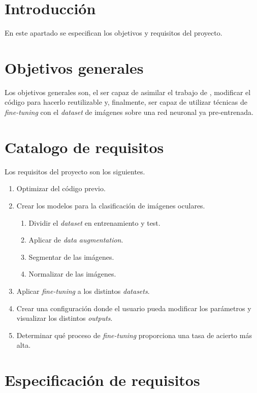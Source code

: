 
\section{Introducción}

En este apartado se especifican los objetivos y requisitos del proyecto.

\section{Objetivos generales}

Los objetivos generales son, el ser capaz de asimilar el trabajo de \cite{tfg_iris_2020}, modificar el código para hacerlo reutilizable y, finalmente, ser capaz de 
utilizar técnicas de \textit{fine-tuning} con el \textit{dataset} de imágenes sobre una red neuronal ya pre-entrenada.

\section{Catalogo de requisitos}

Los requisitos del proyecto son los siguientes.

\begin{enumerate}
    \item Optimizar del código previo.
    \item Crear los modelos para la clasificación de imágenes oculares.
        \begin{enumerate}
            \item Dividir el \textit{dataset} en entrenamiento y test.
            \item Aplicar de \textit{data augmentation}.
            \item Segmentar de las imágenes.
            \item Normalizar de las imágenes.
        \end{enumerate}
    \item Aplicar \textit{fine-tuning} a los distintos \textit{datasets}.
    \item Crear una configuración donde el usuario pueda modificar los parámetros y visualizar los distintos \textit{outputs}.
    \item Determinar qué proceso de \textit{fine-tuning} proporciona una tasa de acierto más alta.
  \end{enumerate}

\section{Especificación de requisitos}

